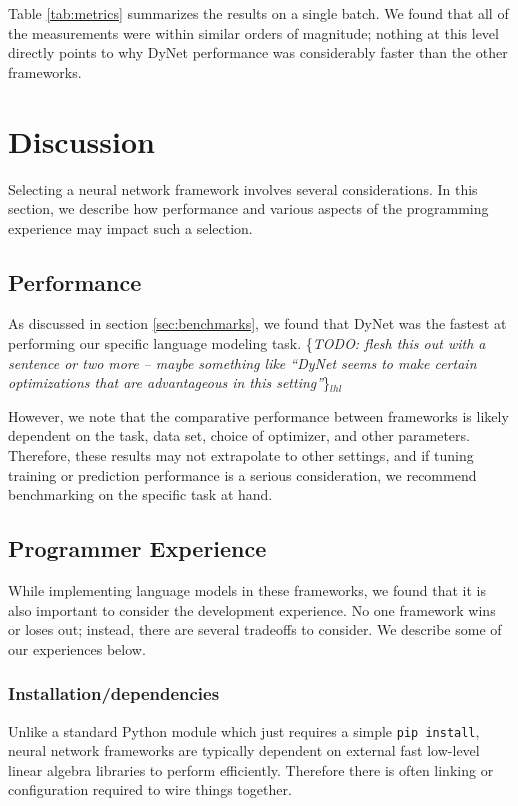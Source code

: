 \documentclass{article}
\newcommand{\lhl}[1]{{\color{magenta}\{\textit{#1}\}$_{lhl}$}}
\begin{document}
Table \ref{tab:metrics} summarizes the results on a single batch. We found that all of the measurements were within similar orders of magnitude; nothing at this level directly points to why DyNet performance was considerably faster than the other frameworks.

\section{Discussion}

Selecting a neural network framework involves several considerations. In this section, we describe how performance and various aspects of the programming experience may impact such a selection.

\subsection{Performance}

As discussed in section \ref{sec:benchmarks}, we found that DyNet was the fastest at performing our specific language modeling task. \lhl{TODO: flesh this out with a sentence or two more -- maybe something like ``DyNet seems to make certain optimizations that are advantageous in this setting''}

However, we note that the comparative performance between frameworks is likely dependent on the task, data set, choice of optimizer, and other parameters. Therefore, these results may not extrapolate to other settings, and if tuning training or prediction performance is a serious consideration, we recommend benchmarking on the specific task at hand.

\subsection{Programmer Experience}

While implementing language models in these frameworks, we found that it is also important to consider the development experience. No one framework wins or loses out; instead, there are several tradeoffs to consider. We describe some of our experiences below.

\subsubsection{Installation/dependencies}

Unlike a standard Python module which just requires a simple \texttt{pip install}, neural network frameworks are typically dependent on external fast low-level linear algebra libraries to perform efficiently. Therefore there is often linking or configuration required to wire things together.
\end{document}
